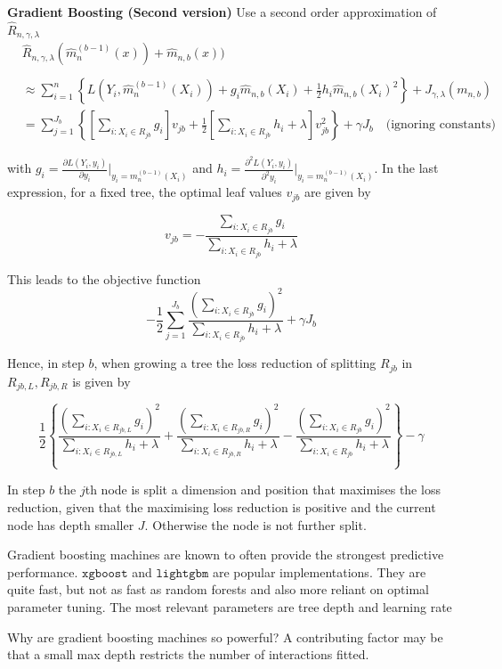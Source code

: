 \documentclass[
]{book}
\begin{document}
\textbf{Gradient Boosting (Second version)} Use a second order approximation of \(\hat R_{n,\gamma,\lambda}\)
\begin{align}
&\hat R_{n,\gamma,\lambda}(\hat m_n^{(b-1)}(x))+\hat m_{n,b}(x))\\
\\&\approx\sum_{i=1}^n \left\{ L(Y_i,\hat 
m_n^{(b-1)}(X_i))+ g_i\hat m_{n,b}(X_i)+ \frac 1 2 h_i \hat m_{n,b}(X_i)^2\right \}+ J_{\gamma,\lambda}(m_{n,b})\\
&= \sum_{j=1}^{J_b}\left \{ \left[\sum_{i: X_i \in R_{jb}}g_i\right]v_{jb} + \frac 1 2 \left[\sum_{i: X_i \in R_{jb}}h_i+\lambda\right]v_{jb}^2 \right\}+\gamma J_b \quad \text{(ignoring constants)}
\end{align}

with \(g_i= \frac{\partial L(Y_i,y_i)}{\partial y_i} \Bigr\rvert_{y_i=m_n^{(b-1)}(X_i)}\) and \(h_i= \frac{\partial^2 L(Y_i,y_i)}{\partial^2 y_i} \Bigr\rvert_{y_i=m_n^{(b-1)}(X_i)}\). In the last expression, for a fixed tree, the optimal leaf values \(v_{jb}\) are given by

\[
v_{jb}=-\frac{\sum_{i: X_i \in R_{jb}} g_i }{\sum_{i: X_i \in R_{jb}} h_i+\lambda}
\]

This leads to the objective function
\[
-\frac 1 2\sum_{j=1}^{J_b} \frac {(\sum_{i: X_i \in R_{jb}}g_i)^2}{\sum_{i: X_i \in R_{jb}}h_i+\lambda}+\gamma J_b
\]

Hence, in step \(b\), when growing a tree the loss reduction of splitting \(R_{jb}\) in \(R_{jb,L},R_{jb,R}\) is given by

\[
\frac 1 2 \left\{\frac {(\sum_{i: X_i \in R_{jb,L}}g_i)^2}{\sum_{i: X_i \in R_{jb,L}}h_i+\lambda}+\frac {(\sum_{i: X_i \in R_{jb,R}}g_i)^2}{\sum_{i: X_i \in R_{jb,R}}h_i+\lambda}-\frac {(\sum_{i: X_i \in R_{jb}}g_i)^2}{\sum_{i: X_i \in R_{jb}}h_i+\lambda}\right\}-\gamma
\]

In step \(b\) the \(j\)th node is split a dimension and position that maximises the loss reduction, given that the maximising loss reduction is positive and the current node has depth smaller \(J\). Otherwise the node is not further split.

Gradient boosting machines are known to often provide the strongest predictive performance. \(\texttt{xgboost}\) and \(\texttt{lightgbm}\) are popular implementations. They are quite fast, but not as fast as random forests and also more reliant on optimal parameter tuning. The most relevant parameters are tree depth and learning rate

Why are gradient boosting machines so powerful? A contributing factor may be that a small max depth restricts the number of interactions fitted.
\end{document}
